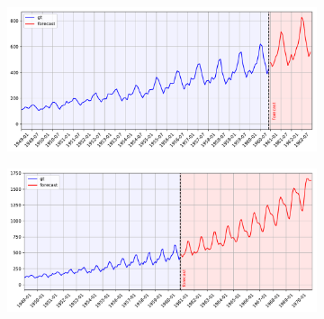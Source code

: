 \documentclass{article}
\begin{document}
\begin{figure}
  \centering
  \begin{subfigure}{0.5\textwidth}
    \centering
    \includegraphics[scale=0.23]{figures/fig7}
    \caption{}
    \label{fig:f7}
  \end{subfigure}%
  \begin{subfigure}{0.5\textwidth}
    \centering
    \includegraphics[scale=0.23]{figures/fig8}
    \caption{}
    \label{fig:f8}
  \end{subfigure}



\end{figure}
\end{document}
